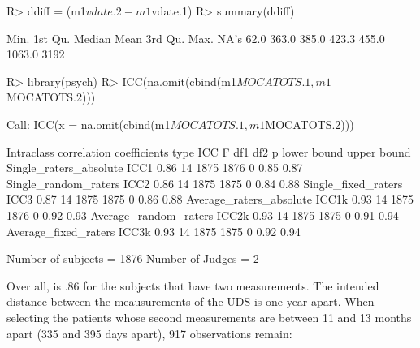 \documentclass[
  nojss]{jss}
\begin{document}
\begin{CodeChunk}

\begin{CodeInput}
R> ddiff = (m1$vdate.2 - m1$vdate.1)
R> summary(ddiff)
\end{CodeInput}

\begin{CodeOutput}
   Min. 1st Qu.  Median    Mean 3rd Qu.    Max.    NA's 
   62.0   363.0   385.0   423.3   455.0  1063.0    3192 
\end{CodeOutput}

\begin{CodeInput}
R> library(psych)
R> ICC(na.omit(cbind(m1$MOCATOTS.1, m1$MOCATOTS.2)))
\end{CodeInput}

\begin{CodeOutput}
Call: ICC(x = na.omit(cbind(m1$MOCATOTS.1, m1$MOCATOTS.2)))

Intraclass correlation coefficients 
                         type  ICC  F  df1  df2 p lower bound upper bound
Single_raters_absolute   ICC1 0.86 14 1875 1876 0        0.85        0.87
Single_random_raters     ICC2 0.86 14 1875 1875 0        0.84        0.88
Single_fixed_raters      ICC3 0.87 14 1875 1875 0        0.86        0.88
Average_raters_absolute ICC1k 0.93 14 1875 1876 0        0.92        0.93
Average_random_raters   ICC2k 0.93 14 1875 1875 0        0.91        0.94
Average_fixed_raters    ICC3k 0.93 14 1875 1875 0        0.92        0.94

 Number of subjects = 1876     Number of Judges =  2
\end{CodeOutput}
\end{CodeChunk}

Over all,  is .86 for the subjects that have two measurements.
The intended distance between the meausurements of the UDS is one year
apart. When selecting the patients whose second measurements are between
11 and 13 months apart (335 and 395 days apart), 917 observations
remain:
\end{document}
